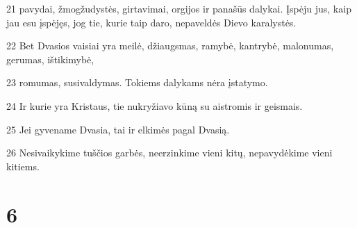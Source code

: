 \par 21 pavydai, žmogžudystės, girtavimai, orgijos ir panašūs dalykai. Įspėju jus, kaip jau esu įspėjęs, jog tie, kurie taip daro, nepaveldės Dievo karalystės. 
\par 22 Bet Dvasios vaisiai yra meilė, džiaugsmas, ramybė, kantrybė, malonumas, gerumas, ištikimybė, 
\par 23 romumas, susivaldymas. Tokiems dalykams nėra įstatymo. 
\par 24 Ir kurie yra Kristaus, tie nukryžiavo kūną su aistromis ir geismais. 
\par 25 Jei gyvename Dvasia, tai ir elkimės pagal Dvasią. 
\par 26 Nesivaikykime tuščios garbės, neerzinkime vieni kitų, nepavydėkime vieni kitiems.


\chapter{6}


